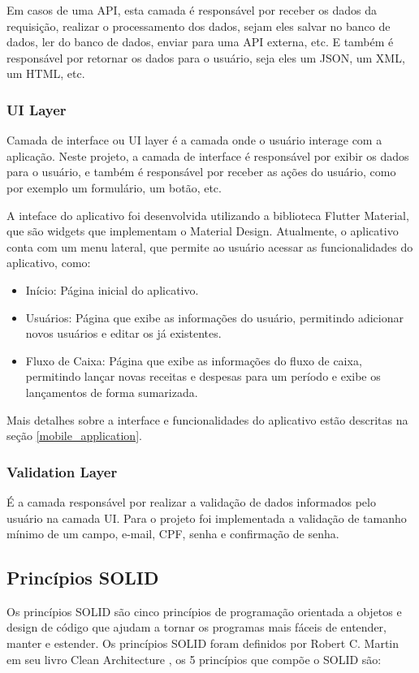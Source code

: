 \documentclass[12pt]{article}
\begin{document}
Em casos de uma API, esta camada é responsável por receber os dados da requisição, realizar o processamento dos dados, sejam eles salvar no banco de dados, ler do banco de dados, enviar para uma API externa, etc. E também é responsável por retornar os dados para o usuário, seja eles um JSON, um XML, um HTML, etc.

\subsubsection{UI Layer}
\label{uiLayer}
Camada de interface ou UI layer é a camada onde o usuário interage com a aplicação. Neste projeto, a camada de interface é responsável por exibir os dados para o usuário, e também é responsável por receber as ações do usuário, como por exemplo um formulário, um botão, etc.

A inteface do aplicativo foi desenvolvida utilizando a biblioteca Flutter Material, que são widgets que implementam o Material Design. Atualmente, o aplicativo conta com um menu lateral, que permite ao usuário acessar as funcionalidades do aplicativo, como:

\begin{itemize}
    \item Início: Página inicial do aplicativo.
    \item Usuários: Página que exibe as informações do usuário, permitindo adicionar novos usuários e editar os já existentes.
    \item Fluxo de Caixa: Página que exibe as informações do fluxo de caixa, permitindo lançar novas receitas e despesas para um período e exibe os lançamentos de forma sumarizada.
\end{itemize}

Mais detalhes sobre a interface e funcionalidades do aplicativo estão descritas na seção \ref{mobile_application}.

\subsubsection{Validation Layer}
\label{validationLayer}
É a camada responsável por realizar a validação de dados informados pelo usuário na camada UI. Para o projeto foi implementada a validação de tamanho mínimo de um campo, e-mail, CPF, senha e confirmação de senha.

\subsection{Princípios SOLID}
\label{SOLID}
Os princípios SOLID são cinco princípios de programação orientada a objetos e design de código que ajudam a tornar os programas mais fáceis de entender, manter e estender. Os princípios SOLID foram definidos por Robert C. Martin em seu livro Clean Architecture \cite{cleanArchitecture}, os 5 princípios que compõe o SOLID são:
 
\end{document}
